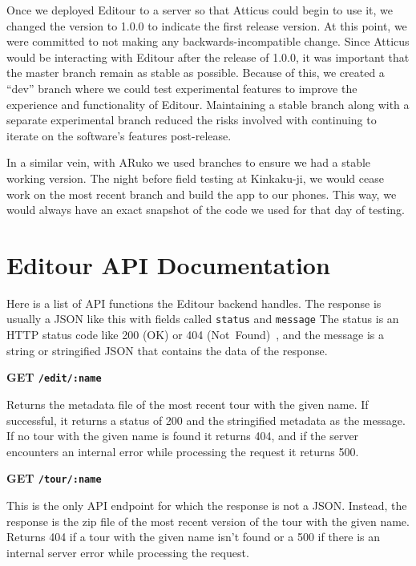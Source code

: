 \documentclass[a4paper, 10pt, american, titlepage]{article}
\newenvironment{indented}[1]%
{\begin{list}{}%
	{\setlength{\leftmargin}{#1}}%
	\item[]%
}
{\end{list}}
\begin{document}
Once we deployed Editour to a server so that Atticus could begin to use it, we
changed the version to 1.0.0 to indicate the first release version. At this
point, we were committed to not making any backwards-incompatible change. Since
Atticus would be interacting with Editour after the release of 1.0.0, it was
important that the master branch remain as stable as possible. Because of this,
we created a ``dev'' branch where we could test experimental features to improve
the experience and functionality of Editour. Maintaining a stable branch along
with a separate experimental branch reduced the risks involved with continuing
to iterate on the software's features post-release.

In a similar vein, with ARuko we used branches to ensure we had a stable working
version. The night before field testing at Kinkaku-ji, we would cease work on
the most recent branch and build the app to our phones. This way, we would
always have an exact snapshot of the code we used for that day of testing.

\clearpage

\section{Editour API Documentation}
\label{sec:editourAPIDocumentation}

Here is a list of API functions the Editour backend handles. The response is
usually a JSON like this with fields called \texttt{status} and \texttt{message}
The status is an HTTP status code like 200 (OK) or 404
(Not~Found)~\autocite{rfc7231}, and the message is a string or stringified JSON
that contains the data of the response. \vspace*{0.5\baselineskip}

\noindent\textbf{GET \texttt{/edit/:name}}

\begin{indented}{1cm}
	Returns the metadata file of the most recent tour with the given name. If
	successful, it returns a status of 200 and the stringified metadata as the
	message. If no tour with the given name is found it returns 404, and if the
	server encounters an internal error while processing the request it returns
	500.
\end{indented}

\noindent\textbf{GET \texttt{/tour/:name}}

\begin{indented}{1cm}
	This is the only API endpoint for which the response is not a JSON. Instead,
	the response is the zip file of the most recent version of the tour with the
	given name. Returns 404 if a tour with the given name isn't found or a 500
	if there is an internal server error while processing the request.
\end{indented}
\end{document}
